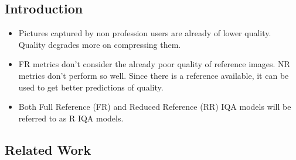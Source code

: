 \documentclass{article}
\begin{document}
    \subsection{Introduction}\label{subsec:Predicting_the_Quality_of_Images_Compressed_After_Distortion_in_Two_Steps:introduction}
    \begin{itemize}
        \item Pictures captured by non profession users are already of lower quality.
        Quality degrades more on compressing them.
        \item FR metrics don't consider the already poor quality of reference images.
        NR metrics don't perform so well.
        Since there is a reference available, it can be used to get better predictions of quality.
        \item Both Full Reference (FR) and Reduced Reference (RR) IQA models will be referred to as R IQA models.
    \end{itemize}

    \subsection{Related Work}\label{subsec:Predicting_the_Quality_of_Images_Compressed_After_Distortion_in_Two_Steps:related-work}
\end{document}
